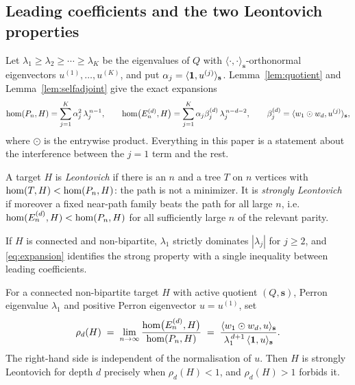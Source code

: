 \subsection{Leading coefficients and the two Leontovich properties}

Let $\lambda_1 \ge \lambda_2 \ge \cdots \ge \lambda_K$ be the eigenvalues
of $Q$ with $\langle\cdot,\cdot\rangle_{\mathbf{s}}$-orthonormal
eigenvectors $u^{(1)},\dots,u^{(K)}$, and put
$\alpha_j = \langle \mathbf{1}, u^{(j)} \rangle_{\mathbf{s}}$. Lemma~\ref{lem:quotient} and
Lemma~\ref{lem:selfadjoint} give the exact expansions
\begin{equation}
  \label{eq:expansion}
  \mathrm{hom}(P_n,H) = \sum_{j=1}^{K} \alpha_j^{2}\, \lambda_j^{\,n-1},
  \qquad
  \mathrm{hom}\bigl(E_n^{(d)},H\bigr)
    = \sum_{j=1}^{K} \alpha_j \beta_j^{(d)}\, \lambda_j^{\,n-d-2},
  \qquad
  \beta_j^{(d)} = \langle w_1 \odot w_d, u^{(j)} \rangle_{\mathbf{s}},
\end{equation}
where $\odot$ is the entrywise product. Everything in this paper is a
statement about the interference between the $j = 1$ term and the rest.

\begin{definition}
  \label{def:leontovich}
  A target $H$ is \emph{Leontovich} if there is an $n$ and a tree $T$ on
  $n$ vertices with $\mathrm{hom}(T,H) < \mathrm{hom}(P_n,H)$: the path is not a
  minimizer. It is \emph{strongly Leontovich}~\cite{galvin2026} if
  moreover a fixed near-path family beats the path for all large $n$,
  i.e.\ $\mathrm{hom}(E_n^{(d)},H) < \mathrm{hom}(P_n,H)$ for all sufficiently large $n$
  of the relevant parity.
\end{definition}

If $H$ is connected and non-bipartite, $\lambda_1$ strictly dominates
$|\lambda_j|$ for $j \ge 2$, and \eqref{eq:expansion} identifies the
strong property with a single inequality between leading coefficients.

\begin{definition}
  \label{def:rho}
  For a connected non-bipartite target $H$ with active quotient
  $(Q,\mathbf{s})$, Perron eigenvalue $\lambda_1$ and positive Perron
  eigenvector $u = u^{(1)}$, set
  \begin{equation}
    \label{eq:rho}
    \rho_d(H) \;=\;
      \lim_{n \to \infty}
      \frac{\mathrm{hom}\bigl(E_n^{(d)},H\bigr)}{\mathrm{hom}(P_n,H)}
    \;=\;
      \frac{\langle w_1 \odot w_d, u \rangle_{\mathbf{s}}}
           {\lambda_1^{\,d+1}\, \langle \mathbf{1}, u \rangle_{\mathbf{s}}} .
  \end{equation}
  The right-hand side is independent of the normalisation of $u$. Then
  $H$ is strongly Leontovich for depth $d$ precisely when
  $\rho_d(H) < 1$, and $\rho_d(H) > 1$ forbids it.
\end{definition}

